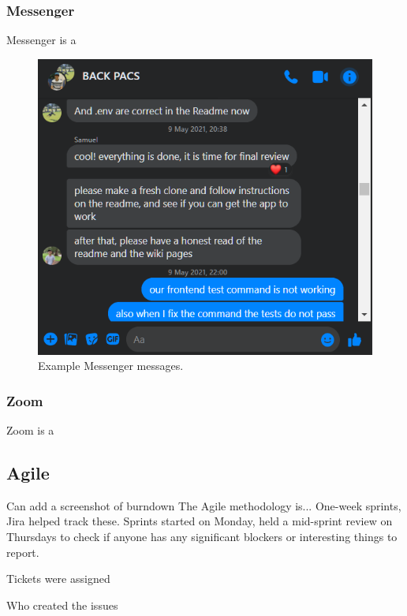 \documentclass[conference]{IEEEtran}
\begin{document}
\subsubsection{Messenger}
Messenger is a 

\begin{figure}[htbp]
\centerline{\includegraphics[width = \linewidth]{messenger.png}}
\caption{Example Messenger messages.}
\label{fig}
\end{figure}

\subsubsection{Zoom}
Zoom is a 
\subsection{Agile}
Can add a screenshot of burndown
The Agile methodology is...
One-week sprints, Jira helped track these. Sprints started on Monday, held a mid-sprint review on Thursdays to check if anyone has any significant blockers or interesting things to report.

Tickets were assigned 

Who created the issues
\end{document}
